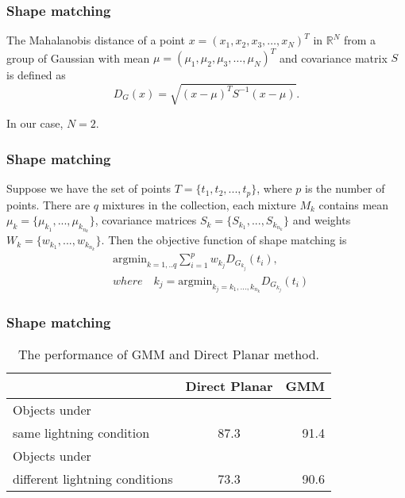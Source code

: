 \documentclass{beamer}
\begin{document}
\begin{frame}
\frametitle{Shape matching}
The Mahalanobis distance of a point $x = ( x_1, x_2, x_3, \dots, x_N )^T$ in $\mathbb{R}^N$ from a group of Gaussian with mean $\mu = ( \mu_1, \mu_2, \mu_3, \dots , \mu_N )^T$ and covariance matrix $S$ is defined as
\begin{equation}
D_G(x) = \sqrt{(x - \mu)^T S^{-1} (x-\mu)}. 
\end{equation}

In our case, $N=2$.

\end{frame}

\begin{frame}
\frametitle{Shape matching}
Suppose we have the set of points $T=\{t_1,t_2,...,t_p\}$, where $p$ is the number of points. There are $q$ mixtures in the collection, each mixture $M_k$ contains mean $\mu_k = \{\mu_{k_1},...,\mu_{k_{n_k}}\}$, covariance matrices $S_k = \{S_{k_1},...,S_{k_{n_k}} \}$ and weights $W_k=\{w_{k_1},...,w_{k_{n_k}} \}$. Then the objective function of shape matching is 
\begin{equation}
\begin{split}
& \mathrm{argmin}_{k=1,..q}  \sum_{i=1}^{p} w_{k_j} D_{G_{k_j}}(t_i),\\
& where \quad k_j = \mathrm{argmin}_{k_j=k_1,...,k_{n_k}} D_{G_{k_j}}(t_i)
\end{split}
\end{equation}
\end{frame}

\begin{frame}
\frametitle{Shape matching}
\begin{table}
\begin{center}
  \begin{tabular}{ l | c | r }
    \hline
     & Direct Planar & GMM \\ \hline
    
    Objects under \\ same lightning condition & 87.3 & 91.4 \\ \hline
    Objects under \\ different lightning conditions & 73.3 & 90.6 \\ 
    \hline
  \end{tabular}
\end{center}
\caption{The performance of GMM and Direct Planar method. }
\label{t:3}
\end{table}
\end{frame}
\end{document}
